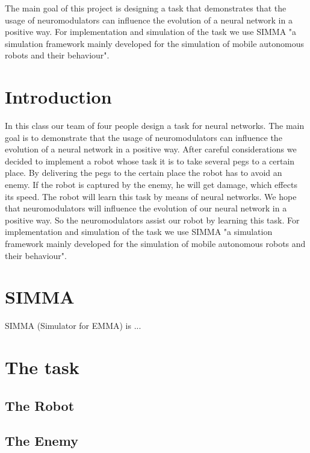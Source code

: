 \documentclass[12pt,fleqn,a4paper]{article}
\begin{document}
\clearpage
\pagestyle{headings}
\setcounter{page}{1}
\setcounter{page}{1}

\tableofcontents
\newpage

\abstract
{The main goal of this project is designing a task that demonstrates that the usage of neuromodulators can influence the evolution of a neural network in a positive way. For implementation and simulation of the task we use SIMMA "a simulation framework mainly developed for the simulation of mobile autonomous robots and their behaviour".}

\section{Introduction}
In this class our team of four people design a task for neural networks.  The main goal is to demonstrate that the usage of neuromodulators can influence the evolution of a neural network in a positive way. After careful considerations we decided to implement a robot whose task it is to take several pegs to a certain place. By delivering the pegs to the certain place the robot has to avoid an enemy. If the robot is captured by the enemy, he will get damage, which effects its speed. The robot will learn this task by means of neural networks.  We hope that neuromodulators will influence the evolution of our neural network in a positive way. So the neuromodulators assist our robot by learning this task. For implementation and simulation of the task we use SIMMA "a simulation framework mainly developed for the simulation of mobile autonomous robots and their behaviour".

\section{SIMMA}
SIMMA (Simulator for EMMA) is ...

\section{The task}

\subsection{The Robot}

\subsection{The Enemy}
\end{document}
